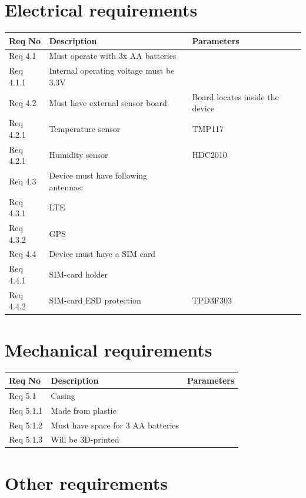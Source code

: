 \documentclass[]{dithesis}
\begin{document}
\section{Electrical requirements}

\begin{tabular}{| l | m{6.5cm} | m{6.5cm} |}
\hline
\textbf{Req No} & \textbf{Description} & \textbf{Parameters}  \\
\hline
Req 4.1 & Must operate with 3x AA batteries &   \\
\hline
Req 4.1.1 & Internal operating voltage must be 3.3V & \\
\hline
Req 4.2 & Must have external sensor board & Board locates inside the device \\
\hline
Req 4.2.1 & Temperature sensor & TMP117 \\
\hline
Req 4.2.1 & Humidity sensor & HDC2010 \\
\hline
Req 4.3 & Device must have following antennas: & \\
\hline
Req 4.3.1 & LTE & \\
\hline
Req 4.3.2 & GPS & \\
\hline
Req 4.4 & Device must have a SIM card & \\
\hline
Req 4.4.1 & SIM-card holder & \\
\hline
Req 4.4.2 & SIM-card ESD protection & TPD3F303 \\
\hline
\end{tabular}

\section{Mechanical requirements}

\begin{tabular}{| l | m{6.5cm} | m{6.5cm} |}
\hline
\textbf{Req No} & \textbf{Description} & \textbf{Parameters}  \\
\hline
Req 5.1 & Casing &   \\
\hline
Req 5.1.1 & Made from plastic & \\
\hline
Req 5.1.2 & Must have space for 3 AA batteries & \\
\hline
Req 5.1.3 & Will be 3D-printed & \\
\hline
\end{tabular}

\section{Other requirements}
\end{document}
